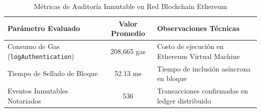 \begin{table}[htbp]
\centering
\caption{Métricas de Auditoría Inmutable en Red Blockchain Ethereum}
\label{tab:blockchain_metrics}
\begin{tabular}{l|c|l}
\hline
\textbf{Parámetro Evaluado} & \textbf{Valor Promedio} & \textbf{Observaciones Técnicas} \\ \hline
Consumo de Gas (\texttt{logAuthentication}) & 208,665 gas & Costo de ejecución en Ethereum Virtual Machine \\
Tiempo de Sellado de Bloque & 52.13 ms & Tiempo de inclusión asíncrona en bloque \\
Eventos Inmutables Notariados & 536 & Transacciones confirmadas en ledger distribuido \\ \hline
\end{tabular}
\end{table}

